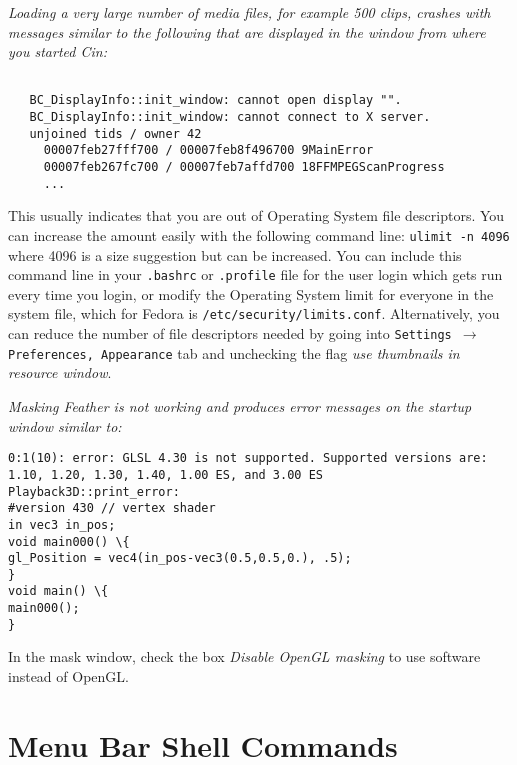 \textit{ Loading a very large number of media files, for example 500 clips, crashes \CGG{} with messages similar to the following that are displayed in the window from where you started Cin:}

\begin{lstlisting}[numbers=none,xleftmargin=10mm]

   BC_DisplayInfo::init_window: cannot open display "".
   BC_DisplayInfo::init_window: cannot connect to X server.
   unjoined tids / owner 42
     00007feb27fff700 / 00007feb8f496700 9MainError
     00007feb267fc700 / 00007feb7affd700 18FFMPEGScanProgress
     ... 

\end{lstlisting}

This usually indicates that you are out of Operating System file descriptors.  You can increase the amount easily with the following command line:  \texttt{ulimit -n 4096}   where 4096 is a size suggestion but can be increased.  You can include this command line in your \texttt{.bashrc} or \texttt{.profile} file for the user login which gets run every time you login, or modify the Operating System limit for everyone in the system file, which for Fedora is \texttt{/etc/security/limits.conf}.  Alternatively, you can reduce the number of file descriptors needed by going into \texttt{Settings $\rightarrow$ Preferences, Appearance} tab and unchecking the flag \textit{use thumbnails in resource window}.

\bigskip
\textit{Masking Feather is not working and produces error messages on the startup window similar to:}

\begin{lstlisting}[numbers=none,xleftmargin=10mm]
0:1(10): error: GLSL 4.30 is not supported. Supported versions are: 1.10, 1.20, 1.30, 1.40, 1.00 ES, and 3.00 ES
Playback3D::print_error:
#version 430 // vertex shader
in vec3 in_pos;
void main000() \{
gl_Position = vec4(in_pos-vec3(0.5,0.5,0.), .5);
}
void main() \{
main000();
}
\end{lstlisting}

In the mask window, check the box \textit{Disable OpenGL masking} to use software instead of OpenGL.

\section{Menu Bar Shell Commands}%
\label{menu_bar_shell_commands}

